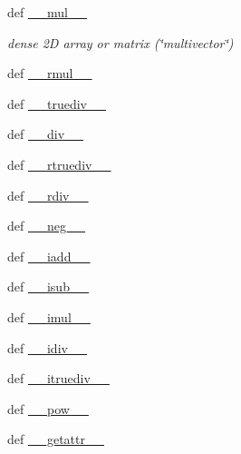\begin{DoxyCompactItemize}
\item 
def \hyperlink{classscipy_1_1sparse_1_1base_1_1spmatrix_aef5f605f426a21517bc8a91f3bfc87f3}{\+\_\+\+\_\+mul\+\_\+\+\_\+}
\begin{DoxyCompactList}\small\item\em dense 2\+D array or matrix (\char`\"{}multivector\char`\"{}) \end{DoxyCompactList}\item 
def \hyperlink{classscipy_1_1sparse_1_1base_1_1spmatrix_a7f17b2726fb61fe5a52a742c759d4c45}{\+\_\+\+\_\+rmul\+\_\+\+\_\+}
\item 
def \hyperlink{classscipy_1_1sparse_1_1base_1_1spmatrix_aaf223b5a62fb70676f18a736e0ca7efa}{\+\_\+\+\_\+truediv\+\_\+\+\_\+}
\item 
def \hyperlink{classscipy_1_1sparse_1_1base_1_1spmatrix_af2aa104b756c6450e61145516ed8f6ab}{\+\_\+\+\_\+div\+\_\+\+\_\+}
\item 
def \hyperlink{classscipy_1_1sparse_1_1base_1_1spmatrix_a473b4b455f672c7f114bcd4abc2dabf4}{\+\_\+\+\_\+rtruediv\+\_\+\+\_\+}
\item 
def \hyperlink{classscipy_1_1sparse_1_1base_1_1spmatrix_a7014b229b14c4e90cc7ad223a4a08c0c}{\+\_\+\+\_\+rdiv\+\_\+\+\_\+}
\item 
def \hyperlink{classscipy_1_1sparse_1_1base_1_1spmatrix_a9234b0814bcbfb3fdc53d82e6fa577c9}{\+\_\+\+\_\+neg\+\_\+\+\_\+}
\item 
def \hyperlink{classscipy_1_1sparse_1_1base_1_1spmatrix_aa22bf1c1b6f0cb818126ec481114e95e}{\+\_\+\+\_\+iadd\+\_\+\+\_\+}
\item 
def \hyperlink{classscipy_1_1sparse_1_1base_1_1spmatrix_a07ecc71ce6ef840c151bfbbccc04609b}{\+\_\+\+\_\+isub\+\_\+\+\_\+}
\item 
def \hyperlink{classscipy_1_1sparse_1_1base_1_1spmatrix_a55ed049ee1914beba8bd649418ac1525}{\+\_\+\+\_\+imul\+\_\+\+\_\+}
\item 
def \hyperlink{classscipy_1_1sparse_1_1base_1_1spmatrix_a28a6d676162a9f3811fb3462ca3459b5}{\+\_\+\+\_\+idiv\+\_\+\+\_\+}
\item 
def \hyperlink{classscipy_1_1sparse_1_1base_1_1spmatrix_a0d53c5c6f458d836d28627c97d6489cb}{\+\_\+\+\_\+itruediv\+\_\+\+\_\+}
\item 
def \hyperlink{classscipy_1_1sparse_1_1base_1_1spmatrix_ab2c0559f15ead321dfdf3122a871964e}{\+\_\+\+\_\+pow\+\_\+\+\_\+}
\item 
def \hyperlink{classscipy_1_1sparse_1_1base_1_1spmatrix_a01840c7d0e69f405fe1550de363a9039}{\+\_\+\+\_\+getattr\+\_\+\+\_\+}

\end{DoxyCompactItemize}

